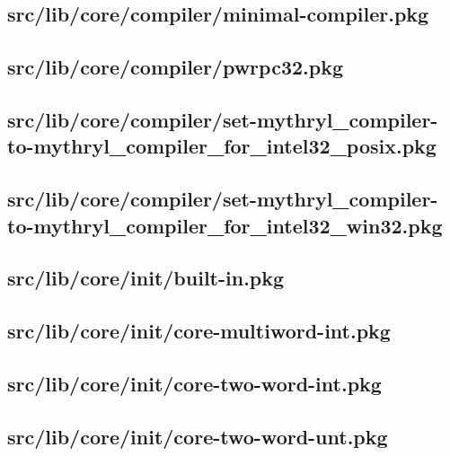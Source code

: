 \subsection{src/lib/core/compiler/minimal-compiler.pkg}


\subsection{src/lib/core/compiler/pwrpc32.pkg}


\subsection{src/lib/core/compiler/set-mythryl\_compiler-to-mythryl\_compiler\_for\_intel32\_posix.pkg}


\subsection{src/lib/core/compiler/set-mythryl\_compiler-to-mythryl\_compiler\_for\_intel32\_win32.pkg}


\subsection{src/lib/core/init/built-in.pkg}


\subsection{src/lib/core/init/core-multiword-int.pkg}


\subsection{src/lib/core/init/core-two-word-int.pkg}


\subsection{src/lib/core/init/core-two-word-unt.pkg}


